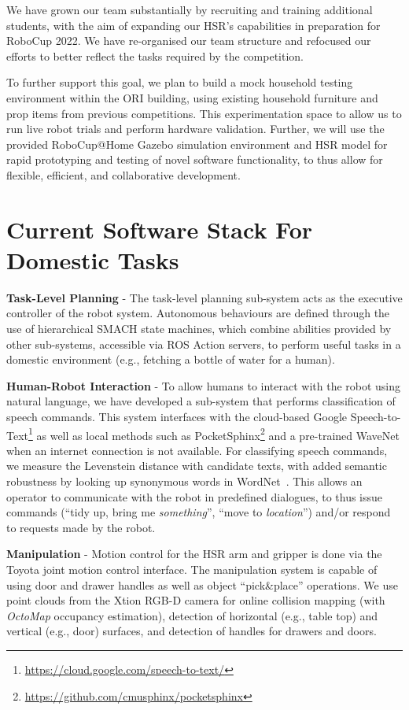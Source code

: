 \documentclass[runningheads,a4paper]{llncs}
\newcommand{\competitionyear}{2022}
\newcommand{\robocuptitleshort}{RoboCup \competitionyear}
\begin{document}
We have grown our team substantially by recruiting and training additional students, with the aim of expanding our HSR's capabilities in preparation for \robocuptitleshort{}. We have re-organised our team structure and refocused our efforts to better reflect the tasks required by the competition.

To further support this goal, we plan to build a mock household testing environment within the ORI building, using existing household furniture and prop items from previous competitions. This experimentation space to allow us to run live robot trials and perform hardware validation. Further, we will use the provided RoboCup@Home Gazebo simulation environment and HSR model for rapid prototyping and testing of novel software functionality, to thus allow for flexible, efficient, and collaborative development.

\section{Current Software Stack For Domestic Tasks}\label{sec:current-software-stack-for-domestic-tasks}
\textbf{Task-Level Planning} - The task-level planning sub-system acts as the executive controller of the robot system. Autonomous behaviours are defined through the use of hierarchical SMACH state machines, which combine abilities provided by other sub-systems, accessible via ROS Action servers, to perform useful tasks in a domestic environment (e.g., fetching a bottle of water for a human).

\textbf{Human-Robot Interaction} - To allow humans to interact with the robot using natural language, we have developed a sub-system that performs classification of speech commands. 
This system interfaces with the cloud-based Google Speech-to-Text\footnote{\url{https://cloud.google.com/speech-to-text/}} as well as local methods such as PocketSphinx\footnote{\url{https://github.com/cmusphinx/pocketsphinx}} and a pre-trained WaveNet \cite{oord2016wavenet} when an internet connection is not available. 
For classifying speech commands, we measure the Levenstein distance with candidate texts, with added semantic robustness by looking up synonymous words in WordNet~\cite{miller1995wordnet}. 
This allows an operator to communicate with the robot in predefined dialogues, to thus issue commands (``tidy up, bring me \emph{something}'', ``move to \emph{location}'') and/or respond to requests made by the robot.

\textbf{Manipulation} - Motion control for the HSR arm and gripper is done via the Toyota joint motion control interface.
%
The manipulation system is capable of using door and drawer handles as well as object ``pick\&place'' operations.
%
We use point clouds from the Xtion RGB-D camera for online collision mapping (with \textit{OctoMap} occupancy estimation), detection of horizontal (e.g., table top) and vertical (e.g., door) surfaces, and detection of handles for drawers and doors.
\end{document}
